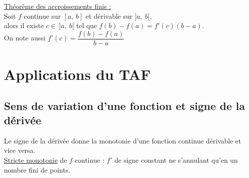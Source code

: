     \underline{Théorème des accroissements finis :}\\
    Soit $f$ continue sur $[a,\ b]$ et dérivable sur $]a,\ b[$,\\
    alors il existe $c \in\ ]a,\ b[$ tel que $f(b) - f(a) = f'(c) (b - a)$.\\
    On note aussi $f'(c) = \dfrac{f(b) - f(a)}{b - a}$


\section{Applications du TAF}\label{sec:applications-du-taf}

    \subsection{Sens de variation d'une fonction et signe de la dérivée}\label{subsec:sens-de-variation-d'une-fonction-et-signe-de-la-derivee}
        Le signe de la dérivée donne la monotonie d'une fonction continue dérivable et vice versa.\\
        \underline{Stricte monotonie} de $f$ continue : $f'$ de signe constant ne s'annulant qu'en un nombre fini de points.

